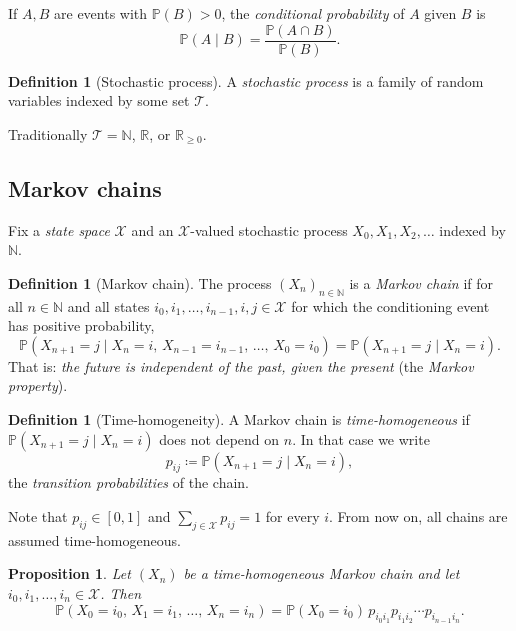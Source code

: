 \documentclass[11pt]{article}
\newtheorem{proposition}[theorem]{Proposition}
\theoremstyle{definition}
\newtheorem{definition}[theorem]{Definition}
\theoremstyle{remark}
\newcommand{\R}{\mathbb{R}}
\newcommand{\N}{\mathbb{N}}
\newcommand{\PP}{\mathbb{P}}
\newcommand{\X}{\mathcal{X}}
\begin{document}
If \(A, B\) are events with \(\PP(B) > 0\), the \emph{conditional probability} of \(A\) given \(B\) is
\begin{equation*}
    \PP(A \mid B) = \frac{\PP(A \cap B)}{\PP(B)}.
\end{equation*}

\begin{definition}[Stochastic process]
A \emph{stochastic process} is a family of random variables indexed by some set \(\mathcal{T}\).
\end{definition}

Traditionally \(\mathcal{T} = \N\), \(\R\), or \(\R_{\ge 0}\).

\subsection{Markov chains}

Fix a \emph{state space} \(\X\) and an \(\X\)-valued stochastic process \(X_0, X_1, X_2, \dots\) indexed by \(\N\).

\begin{definition}[Markov chain]
The process \((X_n)_{n \in \N}\) is a \emph{Markov chain} if for all \(n \in \N\) and all states
\(i_0, i_1, \dots, i_{n-1}, i, j \in \X\) for which the conditioning event has positive probability,
\begin{equation*}
    \PP\!\left(X_{n+1} = j \mid X_n = i,\, X_{n-1} = i_{n-1},\, \dots,\, X_0 = i_0\right)
    = \PP\!\left(X_{n+1} = j \mid X_n = i\right).
\end{equation*}
That is: \emph{the future is independent of the past, given the present} (the \emph{Markov property}).
\end{definition}

\begin{definition}[Time-homogeneity]
A Markov chain is \emph{time-homogeneous} if \(\PP(X_{n+1} = j \mid X_n = i)\) does not depend on \(n\).
In that case we write
\begin{equation*}
    p_{ij} \coloneqq \PP(X_{n+1} = j \mid X_n = i),
\end{equation*}
the \emph{transition probabilities} of the chain.
\end{definition}

Note that \(p_{ij} \in [0,1]\) and \(\sum_{j \in \X} p_{ij} = 1\) for every \(i\). From now on, all chains are
assumed time-homogeneous.

\begin{proposition}\label{prop:path}
Let \((X_n)\) be a time-homogeneous Markov chain and let \(i_0, i_1, \dots, i_n \in \X\). Then
\begin{equation*}
    \PP\!\left(X_0 = i_0,\, X_1 = i_1,\, \dots,\, X_n = i_n\right)
    = \PP(X_0 = i_0)\, p_{i_0 i_1} p_{i_1 i_2} \cdots p_{i_{n-1} i_n}.
\end{equation*}
\end{proposition}
\end{document}
